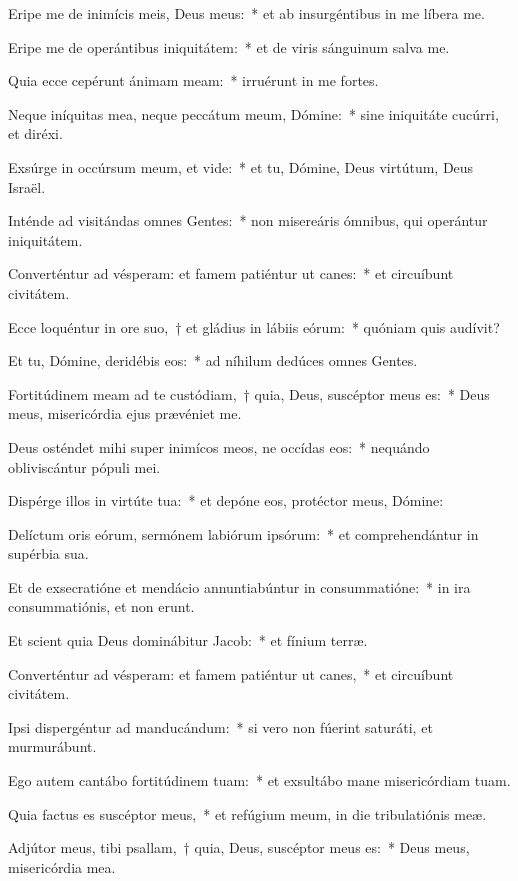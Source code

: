 \item Eripe me de inimícis meis, Deus meus:~* et ab insurgéntibus in me líbera me.

\item Eripe me de operántibus iniquitátem:~* et de viris sánguinum salva me.

\item Quia ecce cepérunt ánimam meam:~* irruérunt in me fortes.

\item Neque iníquitas mea, neque peccátum meum, Dómine:~* sine iniquitáte cucúrri, et diréxi.

\item Exsúrge in occúrsum meum, et vide:~* et tu, Dómine, Deus virtútum, Deus Israël.

\item Inténde ad visitándas omnes Gentes:~* non misereáris ómnibus, qui operántur iniquitátem.

\item Converténtur ad vésperam: et famem patiéntur ut canes:~* et circuíbunt civitátem.

\item Ecce loquéntur in ore suo,~† et gládius in lábiis eórum:~* quóniam quis audívit?

\item Et tu, Dómine, deridébis eos:~* ad níhilum dedúces omnes Gentes.

\item Fortitúdinem meam ad te custódiam,~† quia, Deus, suscéptor meus es:~* Deus meus, misericórdia ejus prævéniet me.

\item Deus osténdet mihi super inimícos meos, ne occídas eos:~* nequándo obliviscántur pópuli mei.

\item Dispérge illos in virtúte tua:~* et depóne eos, protéctor meus, Dómine:

\item Delíctum oris eórum, sermónem labiórum ipsórum:~* et comprehendántur in supérbia sua.

\item Et de exsecratióne et mendácio annuntiabúntur in consummatióne:~* in ira consummatiónis, et non erunt.

\item Et scient quia Deus dominábitur Jacob:~* et fínium terræ.

\item Converténtur ad vésperam: et famem patiéntur ut canes,~* et circuíbunt civitátem.

\item Ipsi dispergéntur ad manducándum:~* si vero non fúerint saturáti, et murmurábunt.

\item Ego autem cantábo fortitúdinem tuam:~* et exsultábo mane misericórdiam tuam.

\item Quia factus es suscéptor meus,~* et refúgium meum, in die tribulatiónis meæ.

\item Adjútor meus, tibi psallam,~† quia, Deus, suscéptor meus es:~* Deus meus, misericórdia mea.

